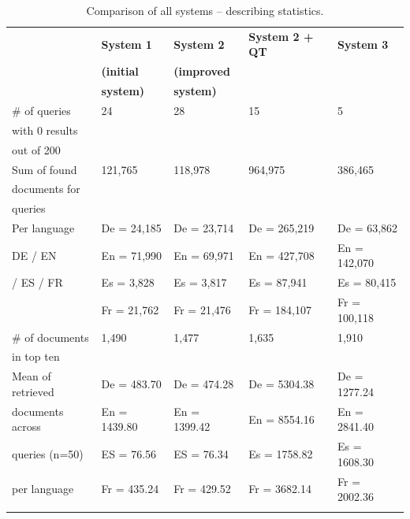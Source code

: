 \documentclass[a4paper,11pt]{article}
\begin{document}
\begin{table}[ht]
\centering
\begin{tabularx}{\textwidth}{lllll}
\toprule
\addlinespace
& \textbf{System 1} & \textbf{System 2} & \textbf{System 2 + QT} & \textbf{System 3} \\
& \textbf{(initial} & \textbf{(improved} &  &  \\
& \textbf{system)}  & \textbf{system)} & & \\
\addlinespace
\cmidrule{1-5}
\addlinespace
\# of queries & 24 & 28 & 15 & 5
 \\
with 0 results & & & & \\
out of 200 & & & & \\
\addlinespace
Sum of found & 121,765 & 118,978 & 964,975 & 386,465
 \\
documents for & & & & \\
queries & & & & \\
\addlinespace
Per language & De = 24,185 & De = 23,714 & De = 265,219 & De = 63,862\\
DE / EN & En = 71,990 & En = 69,971 & En = 427,708 & En = 142,070 \\
/ ES / FR & Es = 3,828 & Es = 3,817 & Es = 87,941 & Es = 80,415 \\
& Fr = 21,762 & Fr = 21,476 & Fr = 184,107 & Fr = 100,118 \\
\addlinespace
\# of documents & 1,490 & 1,477 & 1,635 & 1,910 \\
in top ten & & & & \\
\addlinespace
Mean of retrieved & De = 483.70 & De = 474.28 & De = 5304.38 & De = 1277.24 \\
documents across & En = 1439.80 & En = 1399.42 & En = 8554.16 & En = 2841.40 \\
queries (n=50)  & ES = 76.56 & ES = 76.34 & Es = 1758.82 & Es = 1608.30 \\
per language & Fr = 435.24 & Fr = 429.52 & Fr = 3682.14 & Fr = 2002.36 \\ 
\addlinespace
\addlinespace
\bottomrule
\end{tabularx}
\caption{Comparison of all systems -- describing statistics.}
\label{comparison_all_systems}
\end{table}
\end{document}
